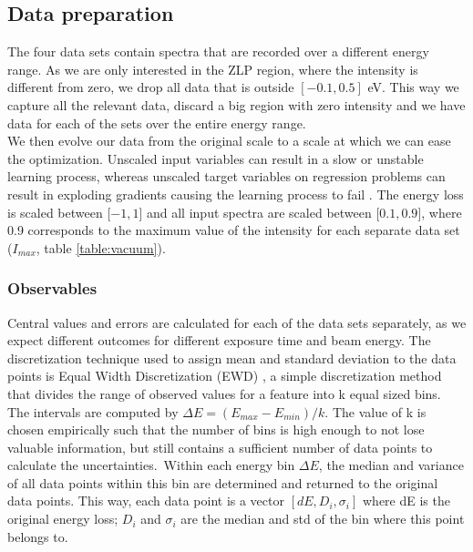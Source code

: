 \documentclass[11pt,a4paper]{article}
\numberwithin{equation}{section}
\numberwithin{figure}{section}
\numberwithin{table}{section}
\begin{document}
\subsection{Data preparation}
The four data sets contain spectra that are recorded over a different energy range. As we are only interested in the ZLP region, where the intensity is different from zero, we drop all data that is outside $[-0.1, 0.5]$ eV. This way we capture all the relevant data, discard a big region with zero intensity and we have data for each of the sets over the entire energy range. \\
We then evolve our data from the original scale to a scale at which we can ease the optimization. Unscaled input variables can result in a slow or unstable learning process, whereas unscaled target variables on regression problems can result in exploding gradients causing the learning process to fail \cite{juan}. The energy loss is scaled between [$-1,1$] and all input spectra are scaled between [$0.1, 0.9$], where 0.9 corresponds to the maximum value of the intensity for each separate data set ($I_{max}$, table \ref{table:vacuum}). \\


\subsubsection*{Observables}
Central values and errors are calculated for each of the data sets separately, as we expect different outcomes for different exposure time and beam energy. The discretization technique used to assign mean and standard deviation to the data points is Equal Width Discretization (EWD) \cite{Dash:2011}, a simple discretization method that divides the range of observed values for a feature into k equal sized bins. The intervals are computed by 
$\Delta E = (E_{max} - E_{min}) / k$. The value of k is chosen empirically such that the number of bins is high enough to not lose valuable information, but still contains a sufficient number of data points to calculate the uncertainties.\
 Within each energy bin $\Delta E$, the median and variance of all data points within this bin are determined and returned to the original data points. This way, each data point is a vector $[dE, D_i, \sigma_i]$ where dE is the original energy loss; $D_i$ and $\sigma_i$ are the median and std of the bin where this point belongs to. 
\end{document}
